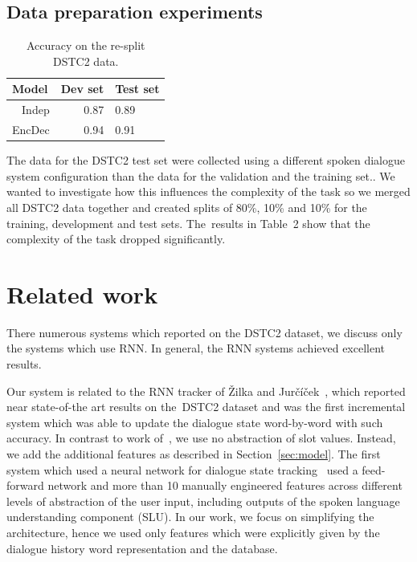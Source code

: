 \documentclass{itatnew}
\begin{document}
\subsection{Data preparation experiments}
\label{sec:split}

\begin{table}
\begin{center}
\begin{tabular}{r@{\quad}rll}
\hline
\multicolumn{1}{l}{\rule{0pt}{12pt}
                   Model}&\multicolumn{1}{l}{Dev set}&\multicolumn{2}{l}{Test set}\\[2pt]
\hline\rule{0pt}{12pt}
Indep  &   0.87 & 0.89 \\
EncDec &   0.94 & 0.91 \\
\hline
\end{tabular}
\caption{Accuracy on the re-split DSTC2 data.}
\vspace{-2em}
\end{center}
\label{tabsplit}
\end{table}

The data for the DSTC2 test set were collected using a different spoken dialogue system configuration than the data for the validation and the training set.\cite{henderson2014second}.
We wanted to investigate how this influences the complexity of the task so we merged all DSTC2 data together and created splits of 80\%, 10\% and 10\% for the training, development and test sets.
The~results in Table~2 show that the complexity of the task dropped significantly.


\section{Related work}
\label{sec:related}

There numerous systems which reported on the DSTC2 dataset, we discuss only the systems which use RNN.
In general, the RNN systems achieved excellent results.

Our system is related to the RNN tracker of Žilka and Jurčíček~\cite{zilka2015incremental},
which reported near state-of-the art results on the~DSTC2 dataset and was the first incremental system which was able to update the dialogue state word-by-word with such accuracy.
In contrast to work of~\cite{zilka2015incremental}, we use no abstraction of slot values. Instead, we add the additional features as described in Section~\ref{sec:model}.
The first system which used a neural network for dialogue state tracking~\cite{henderson2013deep} used a feed-forward network and more than 10 manually engineered features across different levels of abstraction of the user input, including outputs of the spoken language understanding component (SLU).
In our work, we focus on simplifying the architecture, hence we used only features which were explicitly given by the dialogue history word representation and the database.
\end{document}
